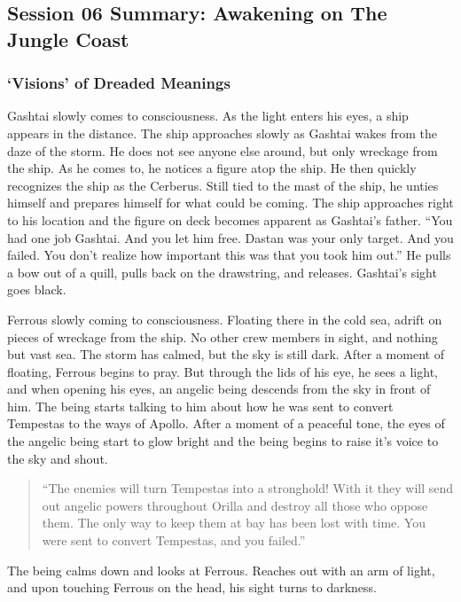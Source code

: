 \subsection{Session 06 Summary: Awakening on The Jungle Coast}

\subsubsection{`Visions' of Dreaded Meanings}

Gashtai slowly comes to consciousness. As the light enters his eyes, a ship appears in the distance. The ship approaches slowly as Gashtai wakes from the daze of the storm. He does not see anyone else around, but only wreckage from the ship. As he comes to, he notices a figure atop the ship. He then quickly recognizes the ship as the Cerberus. Still tied to the mast of the ship, he unties himself and prepares himself for what could be coming. The ship approaches right to his location and the figure on deck becomes apparent as Gashtai's father. ``You had one job Gashtai. And you let him free. Dastan was your only target. And you failed. You don't realize how important this was that you took him out.'' He pulls a bow out of a quill, pulls back on the drawstring, and releases. Gashtai's sight goes black.

Ferrous slowly coming to consciousness. Floating there in the cold sea, adrift on pieces of wreckage from the ship. No other crew members in sight, and nothing but vast sea. The storm has calmed, but the sky is still dark.	After a moment of floating, Ferrous begins to pray. But through the lids of his eye, he sees a light, and when opening his eyes, an angelic being descends from the sky in front of him. The being starts talking to him about how he was sent to convert Tempestas to the ways of Apollo. After a moment of a peaceful tone, the eyes of the angelic being start to glow bright and the being begins to raise it's voice to the sky and shout.

\begin{quote}
	``The enemies will turn Tempestas into a stronghold! With it they will send out angelic powers throughout Orilla and destroy all those who oppose them. The only way to keep them at bay has been lost with time. You were sent to convert Tempestas, and you failed.''
\end{quote}

The being calms down and looks at Ferrous. Reaches out with an arm of light, and upon touching Ferrous on the head, his sight turns to darkness.


